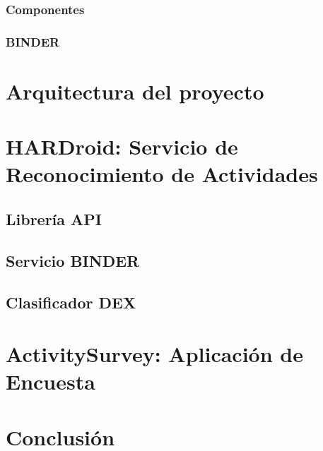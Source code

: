 \subsubsection{Componentes}

\subsubsection{BINDER}

\section{Arquitectura del proyecto}


\section{HARDroid: Servicio de Reconocimiento de Actividades}

\subsection{Librería API}

\subsection{Servicio BINDER}

\subsection{Clasificador DEX}

\section{ActivitySurvey: Aplicación de Encuesta}

\section{Conclusión}
